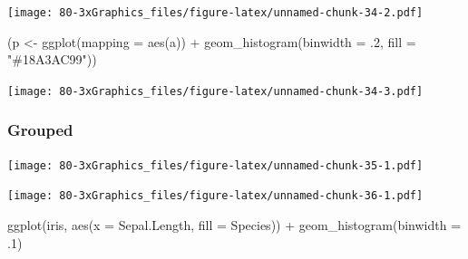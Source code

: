 \documentclass[
]{book}
\newenvironment{Shaded}{\begin{snugshade}}{\end{snugshade}}
\newcommand{\AttributeTok}[1]{\textcolor[rgb]{0.77,0.63,0.00}{#1}}
\newcommand{\DecValTok}[1]{\textcolor[rgb]{0.00,0.00,0.81}{#1}}
\newcommand{\FunctionTok}[1]{\textcolor[rgb]{0.00,0.00,0.00}{#1}}
\newcommand{\NormalTok}[1]{#1}
\newcommand{\OtherTok}[1]{\textcolor[rgb]{0.56,0.35,0.01}{#1}}
\newcommand{\SpecialCharTok}[1]{\textcolor[rgb]{0.00,0.00,0.00}{#1}}
\newcommand{\StringTok}[1]{\textcolor[rgb]{0.31,0.60,0.02}{#1}}
\begin{document}
\texttt{[image: 80-3xGraphics\_files/figure-latex/unnamed-chunk-34-2.pdf]}

\begin{Shaded}
\begin{Highlighting}[]
\NormalTok{(p }\OtherTok{\textless{}{-}} \FunctionTok{ggplot}\NormalTok{(}\AttributeTok{mapping =} \FunctionTok{aes}\NormalTok{(a)) }\SpecialCharTok{+}
    \FunctionTok{geom\_histogram}\NormalTok{(}\AttributeTok{binwidth =}\NormalTok{ .}\DecValTok{2}\NormalTok{, }\AttributeTok{fill =} \StringTok{"\#18A3AC99"}\NormalTok{))}
\end{Highlighting}
\end{Shaded}

\texttt{[image: 80-3xGraphics\_files/figure-latex/unnamed-chunk-34-3.pdf]}

\hypertarget{grouped-2}{%
\subsubsection{Grouped}\label{grouped-2}}

\begin{Shaded}
\end{Shaded}

\texttt{[image: 80-3xGraphics\_files/figure-latex/unnamed-chunk-35-1.pdf]}

\begin{Shaded}
\end{Shaded}

\texttt{[image: 80-3xGraphics\_files/figure-latex/unnamed-chunk-36-1.pdf]}

\begin{Shaded}
\begin{Highlighting}[]
\FunctionTok{ggplot}\NormalTok{(iris, }\FunctionTok{aes}\NormalTok{(}\AttributeTok{x =}\NormalTok{ Sepal.Length, }\AttributeTok{fill =}\NormalTok{ Species)) }\SpecialCharTok{+} 
  \FunctionTok{geom\_histogram}\NormalTok{(}\AttributeTok{binwidth =}\NormalTok{ .}\DecValTok{1}\NormalTok{)}
\end{Highlighting}
\end{Shaded}
\end{document}
